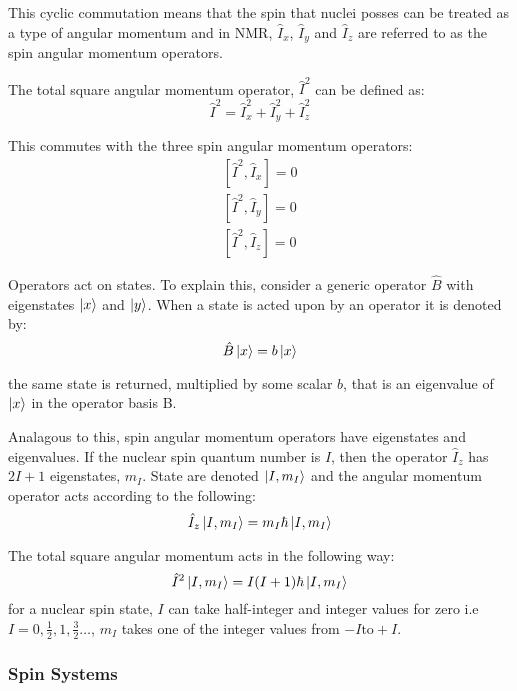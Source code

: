 This cyclic commutation means that the spin that nuclei posses can be treated as a
type of angular momentum and in NMR, $\hat{I}_x$, $\hat{I}_y$ and $\hat{I}_z$ are
referred to as the spin angular momentum operators.

The total square angular momentum operator, $\hat{I}^2$ can be defined as:
\begin{equation}
  \hat{I}^2 = \hat{I}_x^2 + \hat{I}_y^2 + \hat{I}_z^2
\end{equation}

This commutes with the three spin angular momentum operators:
\begin{align}\label{eqn:I2commute}
  [\hat{I}^2,\hat{I}_x] = 0\\
  [\hat{I}^2,\hat{I}_y] = 0\\
  [\hat{I}^2,\hat{I}_z] = 0
\end{align}

Operators act on states. To explain this, consider a generic operator $\hat{B}$ with eigenstates $\ket{x}$ and $\ket{y}$. When a state is acted upon by an operator it is denoted by:
\begin{equation}
  \hat{B}\ket{x} = b\ket{x}
\end{equation}

the same state is returned, multiplied by some scalar $b$, that is an eigenvalue of $\ket{x}$
in the operator basis B.

Analagous to this, spin angular momentum operators have eigenstates and eigenvalues. If the nuclear spin quantum number is $I$, then the operator $\hat{I}_z$ has $2I+1$
eigenstates, $m_I$. State are denoted $\ket{I,m_I}$\citep{dirac_1939} and the angular momentum operator acts according to the following:
\begin{equation}
  \hat{I}_z\ket{I,m_I} = m_I\hbar\ket{I,m_I}
\end{equation}

The total square angular momentum acts in the following way:
\begin{equation}
  \hat{I}^2\ket{I,m_I} = I(I+1)\hbar\ket{I,m_I}
\end{equation}
for a nuclear spin state, $I$ can take half-integer and integer values for zero i.e
$I = 0,\frac{1}{2},1,\frac{3}{2}\dots$, $m_I$ takes one of the integer values from $-I
\text{to} +I$.

\subsubsection{Spin Systems}\label{SpinStates}


